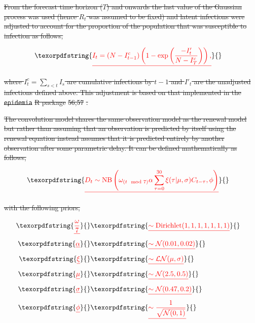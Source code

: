 \documentclass[10pt,letterpaper]{article}
\providecommand{\DIFdeltex}[1]{{\protect\color{red}\sout{#1}}}                      %
\providecommand{\DIFdel}[1]{\texorpdfstring{\DIFdeltex{#1}}{}} %
\begin{document}
\DIFdel{From the forecast time horizon (\(T\)) and onwards the last value of the
Gaussian process was used (hence \(R_t\) was assumed to be fixed) and
latent infections were adjusted to account for the proportion of the
population that was susceptible to infection as follows,
}%

\begin{displaymath}
    \DIFdel{I_t = (N - I^c_{t-1}) \left(1 - \exp \left(\frac{-I'_t}{N - I^c_{T}}\right)\right),
}\end{displaymath}%

\DIFdel{where \(I^c_t = \sum_{s< t} I_s\) are cumulative infections by \(t-1\)
and \(I'_t\) are the unadjusted infections defined above. This
adjustment is based on that implemented in the }\texttt{\DIFdel{epidemia}} %
\DIFdel{R
package }%
\DIFdel{56,57}%
\DIFdel{.
}%


\DIFdel{The convolution model shares the same observation model as the renewal
model but rather than assuming that an observation is predicted by
itself using the renewal equation instead assumes that it is predicted
entirely by another observation after some parametric delay. It can be
defined mathematically as follows,
}%

\begin{displaymath} 
    \DIFdel{D_{t} \sim \mathrm{NB}\left(\omega_{(t \mod 7)} \alpha \sum_{\tau = 0}^{30} \xi(\tau | \mu, \sigma) C_{t-\tau},  \phi \right)
}\end{displaymath}%

\DIFdel{with the following priors,
}%

\begin{align*}
    \DIFdel{\frac{\omega}{7} }&\DIFdel{\sim \mathrm{Dirichlet}(1, 1, 1, 1, 1, 1, 1) }\\
    \DIFdel{\alpha }&\DIFdel{\sim \mathcal{N}(0.01, 0.02) }\\
    \DIFdel{\xi }&\DIFdel{\sim \mathcal{LN}(\mu, \sigma) }\\
    \DIFdel{\mu }&\DIFdel{\sim \mathcal{N}(2.5, 0.5) }\\
\DIFdel{\sigma }&\DIFdel{\sim \mathcal{N}(0.47, 0.2) }\\
\DIFdel{\phi }&\DIFdel{\sim \frac{1}{\sqrt{\mathcal{N}(0, 1)}}
}\end{align*}%
\end{document}
